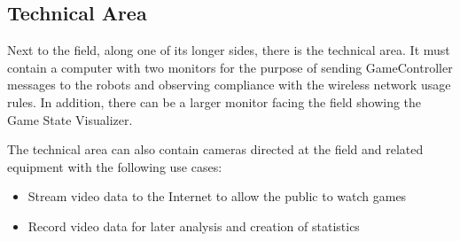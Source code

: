 \subsection{Technical Area}
\label{sec:technical_area}

Next to the field, along one of its longer sides, there is the technical area.
It must contain a computer with two monitors for the purpose of sending GameController messages to the robots and observing compliance with the wireless network usage rules.
In addition, there can be a larger monitor facing the field showing the Game State Visualizer.

The technical area can also contain cameras directed at the field and related equipment with the following use cases:
\begin{itemize}
  \item Stream video data to the Internet to allow the public to watch games
  \item Record video data for later analysis and creation of statistics
\end{itemize}
